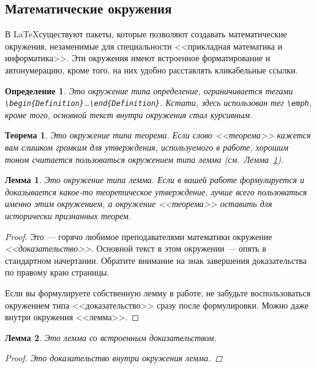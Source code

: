 \documentclass[14pt,russian]{scrartcl}
\newcounter{cTheorem}
\newcounter{cDefinition}
\newcounter{cLemma}
\newtheorem{Theorem}{Теорема}[cTheorem]
\newtheorem{Definition}{Определение}[cDefinition]
\newtheorem{Lemma}{Лемма}[cLemma]
\begin{document}
\subsection{Математические окружения}\label{Sect::MathEnv}

В \LaTeX существуют пакеты, которые позволяют создавать математические окружения, незаменимые для специальности <<прикладная математика и информатика>>. Эти окружения имеют встроенное форматирование и автонумерацию, кроме того, на них удобно расставлять кликабельные ссылки.

\begin{Definition}
Это окружение типа \emph{определение}, ограничивается тегами \texttt{\textbackslash begin\{Definition\}}\dots \texttt{\textbackslash end\{Definition\}}. Кстати, здесь использован тег \texttt{\textbackslash emph}, кроме того, основной текст внутри окружения стал курсивным.
\end{Definition} 

\begin{Theorem}
Это окружение типа \emph{теорема}. Если слово <<теорема>> кажется вам слишком громким для утверждения, используемого в работе, хорошим тоном считается пользоваться окружением типа лемма (см.~Лемма~\ref{Lemma::Lemma}).
\end{Theorem} 

\begin{Lemma}\label{Lemma::Lemma}
Это окружение типа \emph{лемма}. Если в вашей работе формулируется и доказывается какое-то теоретическое утверждение, лучше всего пользоваться именно этим окружением, а окружение <<теорема>> оставить для исторически признанных теорем.
\end{Lemma} 

\begin{proof}
Это --- горячо любимое преподавателями математики окружение \emph{<<доказательство>>}. Основной текст в этом окружении --- опять в стандартном начертании. Обратите внимание на знак завершения доказательства по правому краю страницы.

Если вы формулируете собственную лемму в работе, не забудьте воспользоваться окружением типа <<доказательство>> сразу после формулировки. Можно даже внутри окружения <<лемма>>.
\end{proof}

\begin{Lemma}
Это лемма со встроенным доказательством.
\begin{proof}
Это доказательство внутри окружения лемма.
\end{proof}
\end{Lemma} 
\end{document}
